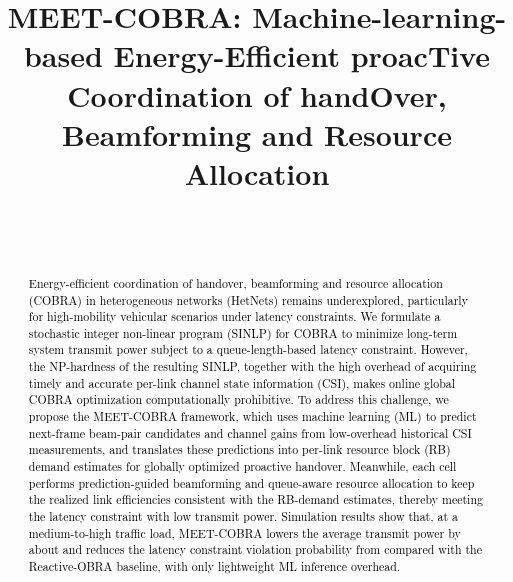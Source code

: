 \documentclass[conference, a4paper]{IEEEtran}
\newcommand{\rev}[1]{\textcolor{revisioncolor}{{}#1}}
\newif\ifshowdeletions
\newcommand{\currentdel}[1]{\ifshowdeletions\textcolor{deletioncolor}{\sout{#1}}\fi}
\theoremstyle{remark}
\begin{document}
\title{MEET-COBRA: Machine-learning-based Energy-Efficient proacTive Coordination of handOver, Beamforming and Resource Allocation}


\author{\\
 \\
}

\maketitle

\begin{abstract}
\textcolor{black}{
Energy-efficient coordination of handover, beamforming and resource allocation (COBRA) in heterogeneous networks (HetNets) remains underexplored, particularly for high-mobility vehicular scenarios under latency constraints.
We formulate a stochastic integer non-linear program (SINLP) for COBRA to minimize long-term system transmit power subject to a queue-length-based latency constraint.
However, the NP-hardness of the resulting SINLP, together with the high overhead of acquiring timely and accurate per-link channel state information (CSI), makes online global COBRA optimization computationally prohibitive.
To address this challenge, we propose the MEET-COBRA framework, which uses machine learning (ML) to predict next-frame beam-pair candidates and channel gains from low-overhead historical CSI measurements, and translates these predictions into per-link resource block (RB) demand estimates for globally optimized proactive handover. 
Meanwhile, each cell performs prediction-guided beamforming and queue-aware resource allocation to keep the realized link efficiencies consistent with the RB-demand estimates, thereby meeting the latency constraint with low transmit power.
Simulation results show that, at a medium-to-high traffic load, MEET-COBRA lowers the average transmit power by about \currentdel{32\%} and reduces the latency constraint violation probability from \currentdel{29.47\% to 0.68\%} compared with the Reactive-OBRA baseline, with only lightweight ML inference overhead.
}
\end{abstract}
\end{document}
